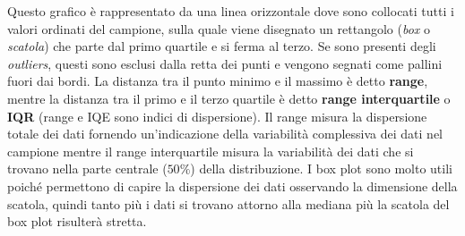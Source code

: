 \begin{center}
\end{center}

\noindent Questo grafico è rappresentato da una linea orizzontale dove sono collocati tutti i valori ordinati del campione, sulla quale viene disegnato un rettangolo (\textit{box} o \textit{scatola}) che parte dal primo quartile e si ferma al terzo. Se sono presenti degli \textit{outliers}, questi sono esclusi dalla retta dei punti e vengono segnati come pallini fuori dai bordi.
La distanza tra il punto minimo e il massimo è detto \textbf{range}, mentre la distanza tra il primo e il terzo quartile è detto \textbf{range interquartile} o \textbf{IQR} (range e IQE sono indici di dispersione). Il range misura la dispersione totale dei dati fornendo un'indicazione della variabilità complessiva dei dati nel campione mentre il range interquartile misura la variabilità dei dati che si trovano nella parte centrale ($50\%$) della distribuzione.
I box plot sono molto utili poiché permettono di capire la dispersione dei dati osservando la dimensione della scatola, quindi tanto più i dati si trovano attorno alla mediana più la scatola del box plot risulterà stretta.


